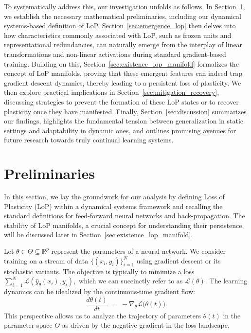 \documentclass{article}
\newcommand{\Loss}{\mathcal{L}}
\newcommand{\R}{\mathbb{R}}
\newcommand{\GIU}[1]{\todo[color=purple!30,size=\tiny]{GIU: #1}}
\numberwithin{figure}{section}
\begin{document}
To systematically address this, our investigation unfolds as follows.
In Section~\ref{sec:preliminaries}, we establish the necessary mathematical preliminaries, including our dynamical systems-based definition of LoP.
Section~\ref{sec:emergence_lop} then delves into how characteristics commonly associated with LoP, such as frozen units and representational redundancies, can naturally emerge from the interplay of linear transformations and non-linear activations during standard gradient-based training.
Building on this, Section~\ref{sec:existence_lop_manifold} formalizes the concept of LoP manifolds, proving that these emergent features can indeed trap gradient descent dynamics, thereby leading to a persistent loss of plasticity.
We then explore practical implications in Section~\ref{sec:mitigation_recovery}, discussing strategies to prevent the formation of these LoP states or to recover plasticity once they have manifested.
Finally, Section~\ref{sec:discussion} summarizes our findings, highlights the fundamental tension between generalization in static settings and adaptability in dynamic ones, and outlines promising avenues for future research towards truly continual learning systems.


\section{Preliminaries}
\label{sec:preliminaries}
In this section, we lay the groundwork for our analysis by defining Loss of Plasticity (LoP) within a dynamical systems framework and recalling the standard definitions for feed-forward neural networks and back-propagation. The stability of LoP manifolds, a crucial concept for understanding their persistence, will be discussed later in Section~\ref{sec:existence_lop_manifold}.

Let $\theta\in\Theta\subseteq\R^p$ represent the parameters of a neural network. We consider training on a stream of data $\{(x_i,y_i)\}_{i=1}^N$ using gradient descent or its stochastic variants. The objective is typically to minimize a loss $\sum_{i=1}^N \Loss(\hat{y}_\theta(x_i),y_i),$ which we can succinctly refer to as $\Loss(\theta)$. The learning dynamics can be idealized by the continuous-time gradient flow:
\begin{equation}
    \frac{d\theta(t)}{dt} \;=\; -\nabla_\theta\Loss\bigl(\theta(t)\bigr).
    \label{eq:grad_flow}
\end{equation}
This perspective allows us to analyze the trajectory of parameters $\theta(t)$ in the parameter space $\Theta$ as driven by the negative gradient in the loss landscape.
\end{document}
